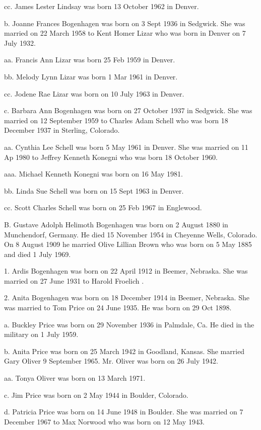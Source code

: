 \documentclass[a4paper]{article}
\begin{document}
cc. James Lester Lindsay was born 13 October 1962 in Denver.

b. Joanne Frances Bogenhagen was born on 3 Sept 1936 in Sedgwick. She was married on 22 March 1958 to Kent Homer Lizar who was born in Denver on 7 July 1932.

aa. Francis Ann Lizar was born 25 Feb 1959 in Denver.

bb. Melody Lynn Lizar was born 1 Mar 1961 in Denver.

cc. Jodene Rae Lizar was born on 10 July 1963 in Denver.
		
c. Barbara Ann Bogenhagen was born on 27 October 1937 in Sedgwick. She was married on 12 September 1959 to Charles Adam Schell who was born 18 December 1937 in Sterling, Colorado.

aa. Cynthia Lee Schell was born 5 May 1961 in Denver.  She was married on 11 Ap 1980 to Jeffrey Kenneth Konegni who was born 18 October 1960.

aaa. Michael Kenneth Konegni was born on 16 May 1981.

bb. Linda Sue Schell was born on 15 Sept 1963 in Denver.

cc. Scott Charles Schell was born on 25 Feb 1967 in Englewood.

B. Gustave Adolph Helimoth Bogenhagen was born on 2 August 1880 in Munchendorf, Germany.  He died 15 November 1954 in Cheyenne Wells, Colorado.  On 8 August 1909 he married Olive Lillian Brown who was born on 5 May 1885 and died 1 July 1969.

1. Ardis Bogenhagen was born on 22 April 1912 in Beemer, Nebraska.  She was married on 27 June 1931 to Harold Froelich .

2. Anita Bogenhagen was born on 18 December 1914 in Beemer, Nebraska.  She was married to Tom Price on 24 June 1935.  He was born on 29 Oct 1898.

a. Buckley Price was born on 29 November 1936 in Palmdale, Ca.  He died in the military on 1 July 1959.

b. Anita Price was born on 25 March 1942 in Goodland, Kansas.  She married Gary Oliver 9 September 1965.  Mr. Oliver was born on 26 July 1942.

aa. Tonya Oliver was born on 13 March 1971.

c. Jim Price was born on 2 May 1944 in Boulder, Colorado.

d. Patricia Price was born on 14 June 1948 in Boulder. She was married on 7 December 1967 to Max Norwood who was born on 12 May 1943.
\end{document}

